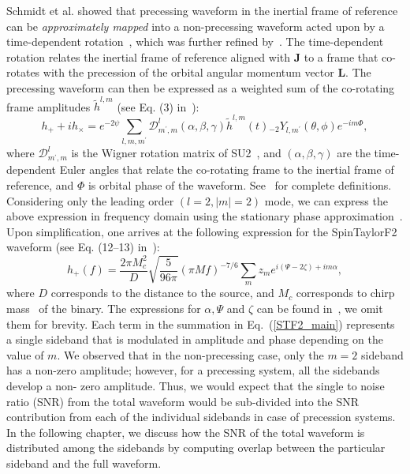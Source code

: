 Schmidt et al. showed that precessing waveform in the inertial frame of
reference can be \textit{approximately mapped} into a non-precessing waveform acted
upon by a time-dependent rotation~\cite{Schmidt2012}, which was further
refined by~\cite{Boyle2011, Rotation}. The time-dependent rotation relates the
inertial frame of reference aligned with $\mathbf{J}$ to a frame that co-rotates 
with the precession of the orbital angular momentum vector
$\mathbf{L}$. The precessing waveform can then be expressed as a weighted sum
of the co-rotating frame amplitudes $\tilde{h}^{l,m}$ (see Eq. (3)
in~\cite{Lundgren2014}):
\begin{equation}   
h_{+} + i h_{\times} = e^{-2 \psi}
\sum_{l,m,m^{\prime}} \mathcal{D}^{l}_{m^{\prime},m} \left(\alpha, \beta, \gamma\right)
\tilde{h}^{l,m}(t){}_{-2}Y_{l,m^{\prime}}\left(\theta,\phi\right)e^{-i m \Phi},
\end{equation}   
where $\mathcal{D}^{l}_{m^{\prime},m}$ is the Wigner rotation matrix of
SU2~\cite{Boyle2011}, and $(\alpha, \beta, \gamma)$ are the time-dependent
Euler angles that relate the co-rotating frame to the inertial frame of
reference, and $\Phi$ is orbital phase of the waveform.
See~\cite{Lundgren2014} for complete definitions. Considering only the leading
order $(l=2, |m| = 2)$ mode, we can express the above expression in frequency
domain using the stationary phase approximation~\cite{Lundgren2014,
Creighton}.  Upon simplification, one arrives at the following expression for
the SpinTaylorF2 waveform (see Eq. (12--13) in~\cite{Lundgren2014}):
\begin{equation}  
\label{STF2_main} 
h_{+}(f) =
\dfrac{2\pi M_{c}^{2}}{D}\sqrt{\dfrac{5}{96\pi}}(\pi M
f)^{-7/6}\sum_{m}z_{m}e^{i(\Psi - 2\zeta) + i m \alpha},
\end{equation} 
where $D$ corresponds to the distance to the source, and $M_{c}$ corresponds to
chirp mass~\cite{Creighton} of the binary. The expressions for $\alpha,
\Psi$ and $\zeta$  can be found in~\cite{Lundgren2014}, we omit them for
brevity. Each term in the summation in Eq.~(\ref{STF2_main}) represents a
single sideband that is modulated in amplitude and phase depending on the
value of $m$. We observed that in  the non-precessing case, only the $m=2$
sideband has a non-zero amplitude; however, for a precessing system, all the
sidebands develop a non- zero amplitude. Thus, we would expect that the single
to noise ratio (SNR) from the total waveform would be sub-divided into the SNR
contribution from each of the individual sidebands in case of precession
systems. In the following chapter, we discuss how the SNR of the total
waveform is distributed among the sidebands by computing overlap between the
particular sideband and the full waveform.






